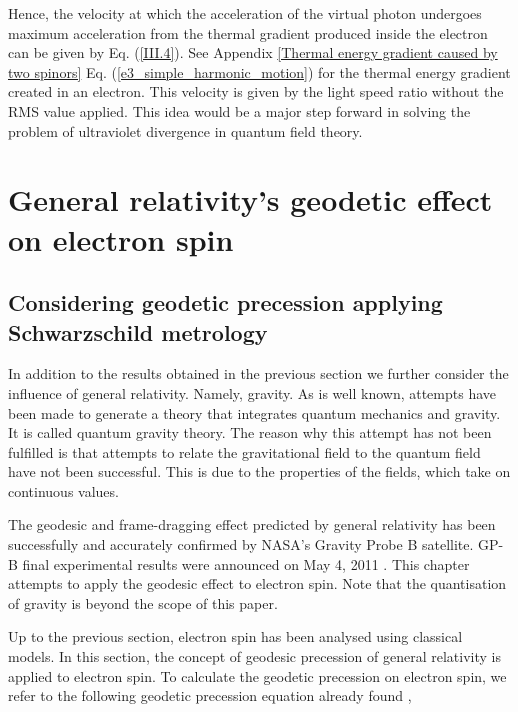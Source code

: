 \documentclass[10.5pt]{article}
\numberwithin{equation}{section}
\begin{document}
Hence, the velocity at which the acceleration of the virtual photon undergoes maximum acceleration from the thermal gradient produced inside the electron can be given by Eq. (\ref{III.4}). See Appendix \ref{Thermal energy gradient caused by two spinors} Eq. (\ref{e3_simple_harmonic_motion}) for the thermal energy gradient created in an electron. This velocity is given by the light speed ratio without the RMS value applied. This idea would be a major step forward in solving the problem of ultraviolet divergence in quantum field theory.


\section{General relativity's geodetic effect on electron spin}
\subsection{Considering geodetic precession applying Schwarzschild metrology}


In addition to the results obtained in the previous section we further consider the influence of general relativity. Namely, gravity. As is well known, attempts have been made to generate a theory that integrates quantum mechanics and gravity. It is called quantum gravity theory. The reason why this attempt has not been fulfilled is that attempts to relate the gravitational field to the quantum field have not been successful. This is due to the properties of the fields, which take on continuous values.

The geodesic and frame-dragging effect predicted by general relativity has been successfully and accurately confirmed by NASA's Gravity Probe B satellite. GP-B final experimental results were announced on May 4, 2011 \cite{NASA}. This chapter attempts to apply the geodesic effect to electron spin. Note that the quantisation of gravity is beyond the scope of this paper.

Up to the previous section, electron spin has been analysed using classical models. In this section, the concept of geodesic precession of general relativity is applied to electron spin. To calculate the geodetic precession on electron spin, we refer to the following geodetic precession equation already found \cite{Hartle},
\end{document}
